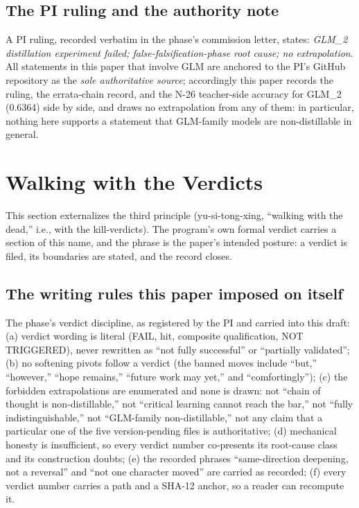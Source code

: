 \documentclass[11pt]{article}
\begin{document}
\subsection{The PI ruling and the authority note}

A PI ruling, recorded verbatim in the phase's commission letter, states: \emph{GLM\_2 distillation experiment failed; false-falsification-phase root cause; no extrapolation}. All statements in this paper that involve GLM are anchored to the PI's GitHub repository as the \emph{sole authoritative source}; accordingly this paper records the ruling, the errata-chain record, and the N-26 teacher-side accuracy for GLM\_2 (0.6364) side by side, and draws no extrapolation from any of them: in particular, nothing here supports a statement that GLM-family models are non-distillable in general.

\section{Walking with the Verdicts}\label{sec:walking}

This section externalizes the third principle (yu-si-tong-xing, ``walking with the dead,'' i.e., with the kill-verdicts). The program's own formal verdict carries a section of this name, and the phrase is the paper's intended posture: a verdict is filed, its boundaries are stated, and the record closes.

\subsection{The writing rules this paper imposed on itself}

The phase's verdict discipline, as registered by the PI and carried into this draft: (a) verdict wording is literal (FAIL, hit, composite qualification, NOT TRIGGERED), never rewritten as ``not fully successful'' or ``partially validated''; (b) no softening pivots follow a verdict (the banned moves include ``but,'' ``however,'' ``hope remains,'' ``future work may yet,'' and ``comfortingly''); (c) the forbidden extrapolations are enumerated and none is drawn: not ``chain of thought is non-distillable,'' not ``critical learning cannot reach the bar,'' not ``fully indistinguishable,'' not ``GLM-family non-distillable,'' not any claim that a particular one of the five version-pending files is authoritative; (d) mechanical honesty is insufficient, so every verdict number co-presents its root-cause class and its construction doubts; (e) the recorded phrases ``same-direction deepening, not a reversal'' and ``not one character moved'' are carried as recorded; (f) every verdict number carries a path and a SHA-12 anchor, so a reader can recompute it.
\end{document}
